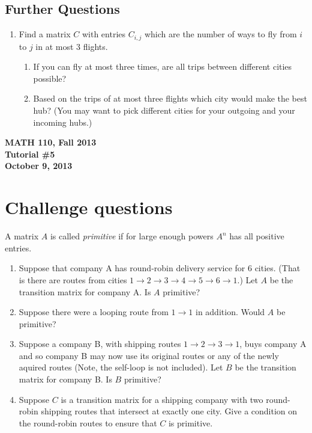 \documentclass[11pt]{exam}
\newcommand{\mthCourse}{MATH 110}
\newcommand{\mthTerm}{Fall 2013}
\newcommand{\mthTutorialNumber}{5}
\newcommand{\mthDate}{October 9, 2013}
\begin{document}
\subsection*{Further Questions}
\begin{enumerate}[resume]
	\item Find a matrix $C$ with entries $C_{i,j}$ which are the number of ways to 
	fly from $i$ to $j$ in at most 3 flights. 
		\begin{enumerate}
			\item If you can fly at most three times, are all trips between 
			different cities possible? 
			\item Based on the trips of at most three flights which city 
			would make the best hub? (You may want to pick different cities
			for your outgoing and your incoming hubs.)
		\end{enumerate}
\end{enumerate}




\newpage
{
	\begin{center}
		{\bf \mthCourse, \mthTerm}\\ 
		{\bf Tutorial \#\mthTutorialNumber}\\
		{\bf \mthDate}
	\end{center}
}

\section*{Challenge questions}

A matrix $A$ is called \emph{primitive} if for large enough powers $A^n$
has all positive entries.
\begin{enumerate}[resume]

	\item Suppose that company A has 
	round-robin
	delivery service for 6 cities.  (That is there are routes from cities $1\to 2\to 3
	\to 4\to 5\to 6\to 1$.)  Let $A$ be the transition matrix for company A.
	Is $A$ primitive?
	\item Suppose there were a looping route from $1\to 1$ in addition.  Would $A$
	be primitive?
	\item Suppose a company B, with shipping routes $1\to 2\to 3\to 1$, buys 
	company A and so company B may now use its original routes or any of the newly
	aquired routes (Note, the self-loop is not included).  
	Let $B$ be the transition matrix for company B.  Is $B$ primitive?
	\item Suppose $C$ is a transition matrix for a shipping company with two round-robin
	shipping routes that intersect at exactly one city.  Give a condition on the 
	round-robin routes to ensure that $C$ is primitive.

\end{enumerate}
\end{document}
